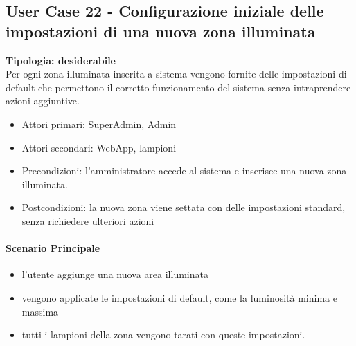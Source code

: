 \documentclass[12pt]{article}
\begin{document}
\subsection{User Case 22 - Configurazione iniziale delle impostazioni di una nuova zona illuminata}
\textbf{Tipologia: desiderabile} \\
Per ogni zona illuminata inserita a sistema vengono fornite delle impostazioni di default che permettono il corretto funzionamento del sistema senza intraprendere azioni aggiuntive.
\begin{itemize}
	\item Attori primari: SuperAdmin, Admin
	\item Attori secondari: WebApp, lampioni
	\item Precondizioni: l'amministratore accede al sistema e inserisce una nuova zona illuminata.
	\item Postcondizioni: la nuova zona viene settata con delle impostazioni standard, senza richiedere ulteriori azioni
\end{itemize}
\paragraph{Scenario Principale}
\begin{itemize}
	\item l'utente aggiunge una nuova area illuminata
	\item vengono applicate le impostazioni di default, come la luminosità minima e massima
	\item tutti i lampioni della zona vengono tarati con queste impostazioni.
\end{itemize}
\end{document}
